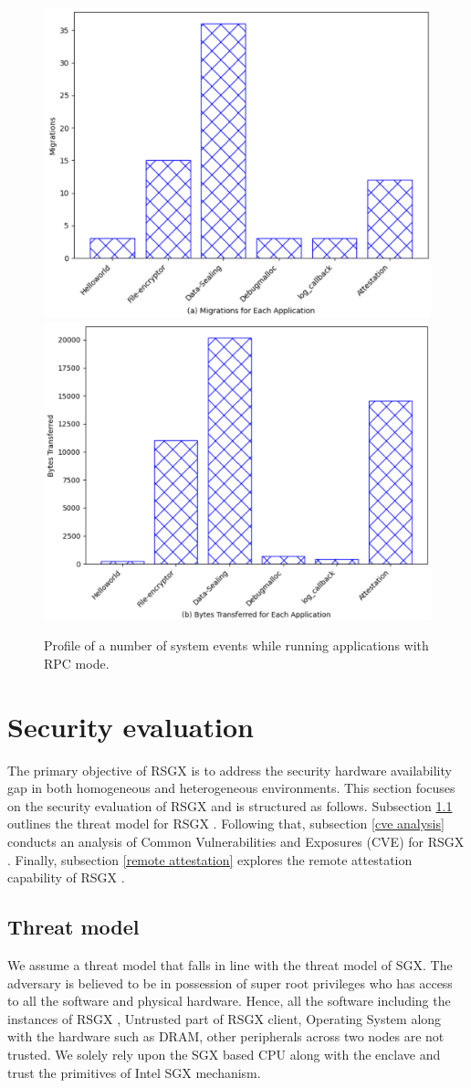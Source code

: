 \documentclass[article, doublespace,nopageskip]{VTthesis} %
\newcommand{\monitor}{RSGX \xspace}
\begin{document}
    \begin{figure}[htp]
    \centering
    \includegraphics[width=.50\textwidth]{figures/a-migrations_rpc.png}%
    \hfill
    \includegraphics[width=.50\textwidth]{figures/b-bytes_transferred_rpc.png}%
    \caption{Profile of a number of system events while running applications with RPC mode.}
    \label{fig:profile_rpc}
    \end{figure}

    
    \section{Security evaluation} \label{sse:Security evaluation}
    The primary objective of \monitor is to address the security hardware availability gap in both homogeneous and heterogeneous environments. This section focuses on the security evaluation of \monitor and is structured as follows. Subsection \ref{ase:threat model} outlines the threat model for \monitor. Following that, subsection \ref{cve analysis} conducts an analysis of Common Vulnerabilities and Exposures (CVE) for \monitor. Finally, subsection \ref{remote attestation} explores the remote attestation capability of \monitor. 
    
    \subsection{Threat model} \label{ase:threat model}
    We assume a threat model that falls in line with the threat model of SGX. The adversary is believed to be in possession of super root privileges who has access to all the software and physical hardware. Hence, all the software including the instances of \monitor, Untrusted part of \monitor client, Operating System along with the hardware such as DRAM, other peripherals across two nodes are not trusted. We solely rely upon the SGX based CPU along with the enclave and trust the primitives of Intel SGX mechanism.
\end{document}
